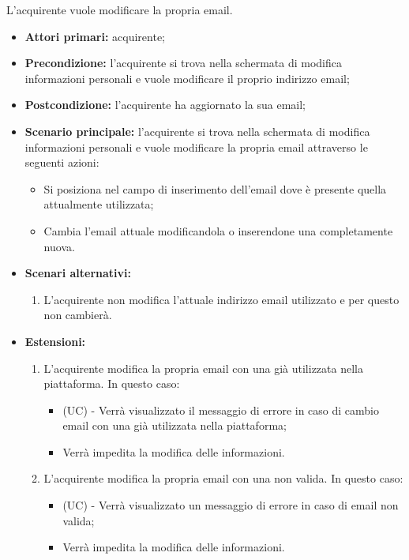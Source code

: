 L'acquirente vuole modificare la propria email.
\begin{itemize}
    \item \textbf{Attori primari:} acquirente;
    \item \textbf{Precondizione:} l'acquirente si trova nella schermata di modifica informazioni personali e vuole modificare il proprio indirizzo email;
    \item \textbf{Postcondizione:} l'acquirente ha aggiornato la sua email;
    \item \textbf{Scenario principale:} l'acquirente si trova nella schermata di modifica informazioni personali e vuole modificare la propria email attraverso le seguenti azioni:
        \begin{itemize}
            \item Si posiziona nel campo di inserimento dell'email dove è presente quella attualmente utilizzata;
            \item Cambia l'email attuale modificandola o inserendone una completamente nuova.
        \end{itemize}
    \item \textbf{Scenari alternativi:} 
    \begin{enumerate}[label=\lett]
        \item L'acquirente non modifica l'attuale indirizzo email utilizzato e per questo non cambierà.
    \end{enumerate}
    \item \textbf{Estensioni:} 
    \begin{enumerate}[label=\lett]
        \item L'acquirente modifica la propria email con una già utilizzata nella piattaforma. In questo caso:
        \begin{itemize}
            \item (UC) - Verrà visualizzato il messaggio di errore in caso di cambio email con una già utilizzata nella piattaforma;
            \item Verrà impedita la modifica delle informazioni.
        \end{itemize}
        \item L'acquirente modifica la propria email con una non valida. In questo caso:
        \begin{itemize}
            \item (UC) - Verrà visualizzato un messaggio di errore in caso di email non valida;
            \item Verrà impedita la modifica delle informazioni.

\end{itemize}
\end{enumerate}
\end{itemize}
